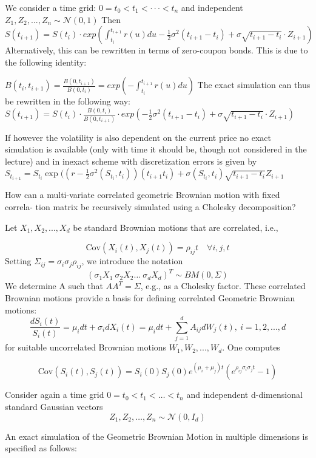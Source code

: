We consider a time grid: \(0=t_{0}<t_{1}<\cdot\cdot\cdot<t_{n}\) and independent \(Z_{1},Z_{2},..., Z_{n}\sim\mathcal{N}(0,1)\)
Then
\(S(t_{i+1})=S(t_{i})\cdot exp \left( \int_{t_{i}}^{t_{i+1}}r(u)du-\frac{1}{2}\sigma^{2}(t_{i+1}-t_{i})+\sigma\sqrt{t_{i+1}-t_{i}}\cdot Z_{i+1} \right)\)
Alternatively, this can be rewritten in terms of zero-coupon bonds. This is due to the following identity:

\(B(t_{i},t_{i+1})=\frac{B(0,t_{i+1})}{B(0,t_{i})}=exp \left( -\int_{t_{i}}^{t_{i+1}}r(u)du \right)\)
The exact simulation can thus be rewritten in the following way:
\(S(t_{i+1})=S(t_{i})\cdot\frac{B(0,t_{i})}{B(0,t_{i+1})}\cdot exp \left( -\frac{1}{2}\sigma^{2}(t_{i+1}-t_{i})+\sigma\sqrt{t_{i+1}-t_{i}}\cdot Z_{i+1} \right)\)

If however the volatility is also dependent on the current price no exact simulation is available (only with time it should be, though not considered in the lecture)
and in inexact scheme with discretization errors is given by
\( S_{t_{i+1}} = S_{t_i}\exp((r - \frac{1}{2}\sigma^2(S_{t_i},t_i))(t_{i+1} t_i) + \sigma(S_{t_i}, t_i)\sqrt{t_{i+1} - t_i}Z_{i+1} \)


How can a multi-variate correlated geometric Brownian motion with fixed correla-
tion matrix be recursively simulated using a Cholesky decomposition?

Let  \(X_1, X_2, ..., X_d\) be standard Brownian motions that are correlated, i.e.,

\[\text{Cov}(X_i(t), X_j(t)) = \rho_{ij} t \quad \forall i,j,t\]
Setting \(\Sigma_{ij} = \sigma_i \sigma_j \rho_{ij}\), we introduce the notation
\[(\sigma_1 X_1 \ \sigma_2 X_2 \dots \ \sigma_d X_d)^T \sim BM(0, \Sigma)\]
We determine A such that \(AA^T = \Sigma\), e.g., as a Cholesky factor.
These correlated Brownian motions provide a basis for defining correlated Geometric Brownian motions:
\[\frac{dS_i(t)}{S_i(t)} = \mu_i dt + \sigma_i dX_i(t) = \mu_i dt + \sum_{j=1}^d A_{ij} dW_j(t),\ i = 1, 2, ..., d\]
for suitable uncorrelated Brownian motions \(W_1, W_2, ..., W_d\). One computes

\[\text{Cov}(S_i(t), S_j(t)) = S_i(0) S_j(0) e^{(\mu_i + \mu_j)t} (e^{\rho_{ij} \sigma_i \sigma_j t} - 1)\] 

Consider again a time grid \(0=t_{0}<t_{1}<\dots<t_{n}\) and independent d-dimensional standard Gaussian vectors
\[Z_{1},Z_{2},\dots,Z_{n}\sim\mathcal{N}(0,I_{d})\]

An exact simulation of the Geometric Brownian Motion in multiple dimensions is specified as follows:

